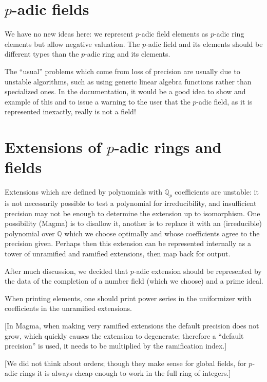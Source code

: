 \documentclass[12pt]{amsart}
\newcommand{\Q}{\mathbb Q}
\begin{document}
\section{$p$-adic fields}

We have no new ideas here: we represent $p$-adic field elements as $p$-adic ring elements but allow negative valuation.  The $p$-adic field and its elements should be different types than the $p$-adic ring and its elements.

The ``usual'' problems which come from loss of precision are usually due to unstable algorithms, such as using generic linear algebra functions rather than specialized ones.  In the documentation, it would be a good idea to show and example of this and to issue a warning to the user that the $p$-adic field, as it is represented inexactly, really is not a field!

\section{Extensions of $p$-adic rings and fields}

Extensions which are defined by polynomials with $\Q_p$ coefficients are unstable: it is not necessarily possible to test a polynomial for irreducibility, and insufficient precision may not be enough to determine the extension up to isomorphism.  One possibility (Magma) is to disallow it, another is to replace it with an (irreducible) polynomial over $\Q$ which we choose optimally and whose coefficients agree to the precision given.  Perhaps then this extension can be represented internally as a tower of unramified and ramified extensions, then map back for output.  

After much discussion, we decided that $p$-adic extension should be represented by the data of the completion of a number field (which we choose) and a prime ideal.

When printing elements, one should print power series in the uniformizer with coefficients in the unramified extensions.  

[In Magma, when making very ramified extensions the default precision does not grow, which quickly causes the extension to degenerate; therefore a ``default precision'' is used, it needs to be multiplied by the ramification index.]

[We did not think about orders; though they make sense for global fields, for $p$-adic rings it is always cheap enough to work in the full ring of integers.]
\end{document}
